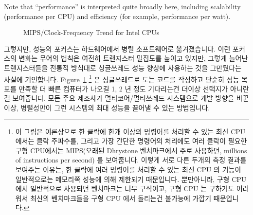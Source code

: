 Note that ``performance'' is interpreted quite broadly here,
including scalability (performance per CPU) and efficiency
(for example, performance per watt).
\fi

\begin{figure}[tb]
\centering
{}
\caption{MIPS/Clock-Frequency Trend for Intel CPUs}
\label{fig:intro:Clock-Frequency Trend for Intel CPUs}
\end{figure}

그렇지만, 성능의 포커스는 하드웨어에서 병렬 소프트웨어로 옮겨졌습니다.
이런 포커스의 변화는 무어의 법칙은 여전히 트랜지스터 밀집도를 높이고 있지만,
그렇게 늘어난 트랜지스터들을 전통적 방식대로 싱글쓰레드 성능 향상에 사용하는
것을 그만뒀다는 사실에 기인합니다.
Figure~\ref{fig:intro:Clock-Frequency Trend for Intel CPUs} \footnote{
	이 그림은 이론상으로 한 클락에 한개 이상의 명령어를 처리할 수 있는 최신
	CPU 에서는 클락 주파수를, 그리고 가장 간단한 명령어의 처리에도 여러
	클락이 필요한 구형 CPU에서는 MIPS(오래된 Dhrystone 벤치마크에서 주로
	사용하던, millions of instructions per second) 를 보여줍니다.
	이렇게 서로 다른 두개의 측정 결과를 보여주는 이유는, 한 클락에 여러
	명령어를 처리할 수 있는 최신 CPU 의 기능이 일반적으로는 메모리쪽 성능에
	의해 제한되기 때문입니다.
	뿐만아니라, 구형 CPU 에서 일반적으로 사용되던 벤치마크는 너무 구식이고,
	구형 CPU 는 구하기도 어려워서 최신의 벤치마크들을 구형 CPU 에서
	돌리는건 불가능에 가깝기 때문입니다.}
은 싱글쓰레드로 도는 코드를 작성하고 단순히 성능 목표를 만족할 더 빠른 컴퓨터가
나오길 1, 2 년 정도 기다리는건 더이상 선택지가 아니란 걸 보여줍니다.
모든 주요 제조사가 멀티코어/멀티쓰레드 시스템으로 개발 방향을 바꾼 이상,
병렬성만이 그런 시스템의 최대 성능을 끌어낼 수 있는 방법입니다.
\iffalse

